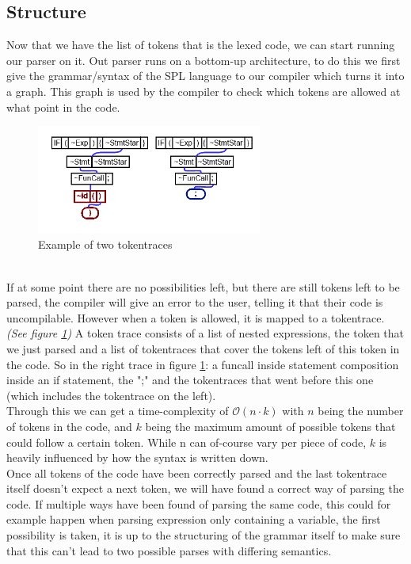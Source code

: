 \documentclass[10pt,a4paper]{article}
\begin{document}
\subsection{Structure}
Now that we have the list of tokens that is the lexed code, we can start running our parser on it.
Out parser runs on a bottom-up architecture, to do this we first give the grammar/syntax of the SPL language to our compiler which turns it into a graph.
 This graph is used by the compiler to check which tokens are allowed at what point in the code.
\begin{figure}[h]
\centering
\includegraphics[width=280px]{TokenTraces.png}
\caption{Example of two tokentraces}
\label{fig:traces}
\end{figure}\\
 If at some point there are no possibilities left, but there are still tokens left to be parsed, the compiler will give an error to the user, telling it that their code is uncompilable.
However when a token is allowed, it is mapped to a tokentrace. \textit{(See figure \ref{fig:traces})} A token trace consists of a list of nested expressions, the token that we just parsed and a list of tokentraces that cover the tokens left of this token in the code. So in the right trace in figure \ref{fig:traces}: a funcall inside statement composition inside an if statement, the ";" and the tokentraces that went before this one (which includes the tokentrace on the left). \\
Through this we can get a time-complexity of $\mathcal{O}(n \cdot k) $ with $n$ being the number of tokens in the code, and $k$ being the maximum amount of possible tokens that could follow a certain token. While n can of-course vary per piece of code, $k$ is heavily influenced by how the syntax is written down.\\
Once all tokens of the code have been correctly parsed and the last tokentrace itself doesn't expect a next token, we will have found a correct way of parsing the code. If multiple ways have been found of parsing the same code, this could for example happen when parsing expression only containing a variable, the first possibility is taken, it is up to the structuring of the grammar itself to make sure that this can't lead to two possible parses with differing semantics.
\end{document}
